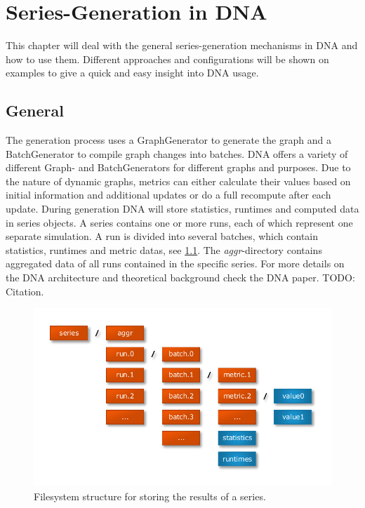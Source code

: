 \chapter{Series-Generation in DNA}
This chapter will deal with the general series-generation mechanisms in DNA and how to use them. Different approaches and configurations will be shown on examples to give a quick and easy insight into DNA usage.

\section{General}
The generation process uses a GraphGenerator to generate the graph and a BatchGenerator to
compile graph changes into batches. DNA offers a variety of different Graph- and BatchGenerators for different graphs and purposes. Due to the nature of dynamic graphs, metrics can either calculate their values based on initial information and additional updates or do a full recompute after each update. During generation DNA will store statistics, runtimes and computed data in series objects. A series contains one or more runs, each of which represent one separate simulation. A run is divided into several batches, which contain statistics, runtimes and metric datas, see \ref{fig:filesystem-struct}. The \textit{aggr}-directory contains aggregated data of all runs contained in the specific series. For more details on the DNA architecture and theoretical background check the DNA paper. TODO: Citation.

\begin{figure} [h]
\centering
\includegraphics [scale=1.2] {images/fs-struct}
\caption{Filesystem structure for storing the results of a series.}
\label{fig:filesystem-struct}
\end{figure}

